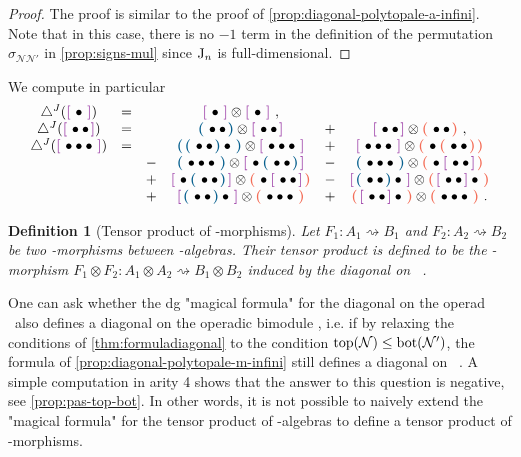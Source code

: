 \documentclass[10pt]{amsart}
\newtheorem{definition}{Definition}[section]
\theoremstyle{remark}
\begin{document}
\begin{proof}
The proof is similar to the proof of \cref{prop:diagonal-polytopale-a-infini}. 
Note that in this case, there is no $-1$ term in the definition of the permutation $\sigma_{\mathcal{N}\mathcal{N}'}$ in \cref{prop:signs-mul} since $\mathrm{J}_n$ is full-dimensional. 
\end{proof}

We compute in particular 
\[
\begin{matrix}
\diagminf ( \purple{ \bullet } )  
&=&  & \purple{ \bullet } \otimes \purple{ \bullet } \ , & &  \\
\diagminf ( \purple{ \bullet \bullet } ) 
&=& & \blue{\bullet \bullet} \otimes \purple{\bullet \bullet} & + & \purple{\bullet \bullet} \otimes \red{\bullet \bullet} \ , \\
\diagminf (\purple{\bullet \bullet \bullet}) 
&=& 
& \blue{\blue{\bullet \bullet}\bullet} \otimes \purple{\bullet \bullet \bullet} 
& + & \purple{\bullet \bullet \bullet} \otimes \red{\bullet \red{\bullet \bullet}} \\
& &- &  \blue{\bullet \bullet \bullet} \otimes \purple{\bullet \blue{\bullet \bullet}}    &  - & \blue{\bullet \bullet \bullet} \otimes \red{\bullet \purple{\bullet \bullet}}  \\  &   &+ & \purple{\bullet \blue{\bullet \bullet}} \otimes \red{\bullet \purple{\bullet \bullet}} 
  &  - & \purple{\blue{\bullet \bullet} \bullet} \otimes \red{\purple{\bullet \bullet} \bullet} \\ & &  + & \purple{\blue{\bullet \bullet} \bullet} \otimes \red{\bullet \bullet \bullet}   &  + & \red{\purple{\bullet \bullet} \bullet} \otimes \red{\bullet \bullet \bullet} \ .
  \end{matrix}
\]

\begin{definition}[Tensor product of \Ainf -morphisms] \label{def:tensor-ainf-morph}
Let $F_1 : A_1 \rightsquigarrow B_1$ and $F_2 : A_2 \rightsquigarrow B_2$ be two \Ainf -morphisms between \Ainf-algebras.
Their tensor product is defined to be the \Ainf -morphism $F_1 \otimes F_2 : A_1 \otimes A_2 \rightsquigarrow B_1 \otimes B_2$ induced by the diagonal \diagminf on \Minf \ .
\end{definition}

One can ask whether the dg "magical formula" for the diagonal on the operad \Ainf\
also defines a diagonal on the operadic bimodule \Minf, i.e. if by relaxing the conditions of \cref{thm:formuladiagonal} to the condition $\operatorname{top}(\mathcal{N}) \leq \operatorname{bot}(\mathcal{N'})$, the formula of \cref{prop:diagonal-polytopale-m-infini} still defines a diagonal on \Minf \ . A simple computation in arity 4 shows that the answer to this question is negative, see \cref{prop:pas-top-bot}. In other words, it is not possible to naively extend the "magical formula" for the tensor product of \Ainf -algebras to define a tensor product of \Ainf -morphisms.
\end{document}
